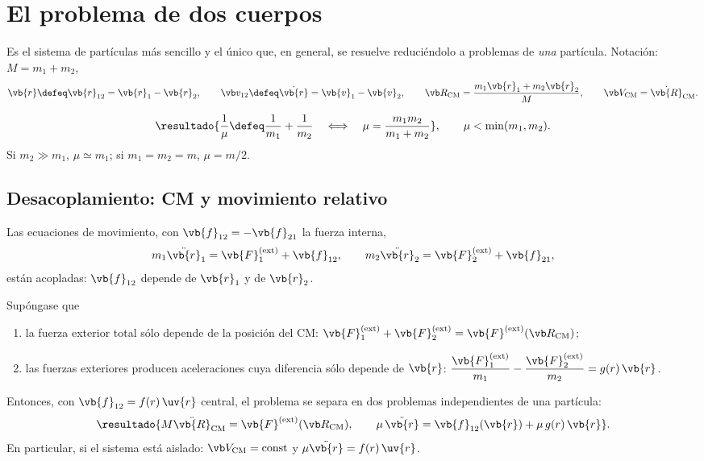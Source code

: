 \section{El problema de dos cuerpos}
\label{sec:dos-cuerpos}

Es el sistema de partículas más sencillo y el único que, en general, se resuelve
reduciéndolo a problemas de \emph{una} partícula. Notación: $M=m_{1}+m_{2}$,
\[
  \vb{r}\defeq\vb{r}_{12}=\vb{r}_{1}-\vb{r}_{2},\qquad
  \vrel\defeq\dot{\vb{r}}=\vb{v}_{1}-\vb{v}_{2},\qquad
  \Rcm=\frac{m_{1}\vb{r}_{1}+m_{2}\vb{r}_{2}}{M},\qquad \Vcm=\dot{\vb{R}}\cm .
\]

\begin{definicion}
\label{def:mu}
\begin{equation}
  \resultado{\frac1\mu\defeq\frac1{m_{1}}+\frac1{m_{2}}
  \quad\Longleftrightarrow\quad \mu=\frac{m_{1}m_{2}}{m_{1}+m_{2}}} ,
  \qquad \mu<\min(m_{1},m_{2}).
  \label{eq:mu}
\end{equation}
Si $m_{2}\gg m_{1}$, $\mu\simeq m_{1}$; si $m_{1}=m_{2}=m$, $\mu=m/2$.
\end{definicion}

\subsection{Desacoplamiento: CM y movimiento relativo}

Las ecuaciones de movimiento, con $\vb{f}_{12}=-\vb{f}_{21}$ la fuerza interna,
\begin{equation}
  m_{1}\ddot{\vb{r}}_{1}=\vb{F}_{1}\ext+\vb{f}_{12},\qquad
  m_{2}\ddot{\vb{r}}_{2}=\vb{F}_{2}\ext+\vb{f}_{21},
  \label{eq:dos-cuerpos}
\end{equation}
están acopladas: $\vb{f}_{12}$ depende de $\vb{r}_{1}$ y de $\vb{r}_{2}$.

\begin{teorema}[Desacoplamiento]
\label{teo:desacoplamiento}
Supóngase que
\begin{enumerate}[label=\textup{(\roman*)},leftmargin=2em]
  \item la fuerza exterior total sólo depende de la posición del CM:
        $\vb{F}_{1}\ext+\vb{F}_{2}\ext=\vb{F}\ext(\Rcm)$;
  \item las fuerzas exteriores producen aceleraciones cuya diferencia sólo
        depende de $\vb{r}$: $\dfrac{\vb{F}_{1}\ext}{m_{1}}-\dfrac{\vb{F}_{2}\ext}{m_{2}}=g(r)\,\vb{r}$.
\end{enumerate}
Entonces, con $\vb{f}_{12}=f(r)\,\uv{r}$ central, el problema se separa en dos
problemas independientes de una partícula:
\begin{equation}
  \resultado{M\ddot{\vb{R}}\cm=\vb{F}\ext(\Rcm),\qquad
  \mu\,\ddot{\vb{r}}=\vb{f}_{12}(\vb{r})+\mu\,g(r)\,\vb{r}} .
  \label{eq:desacoplado}
\end{equation}
En particular, si el sistema está aislado: $\Vcm=\text{const}$ y $\mu\ddot{\vb{r}}=f(r)\,\uv{r}$.
\end{teorema}

